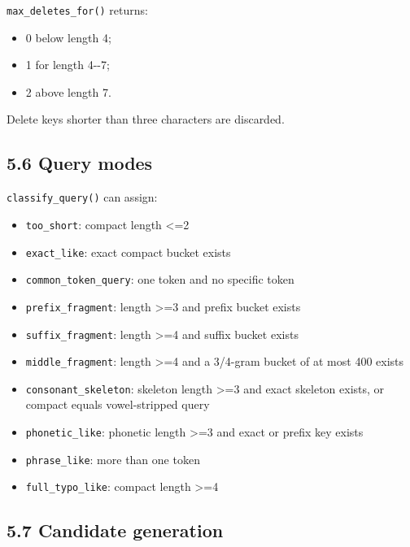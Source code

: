 \texttt{max\_\allowbreak{}deletes\_\allowbreak{}for()} returns:

\begin{itemize}
\tightlist
\item
  0 below length 4;
\item
  1 for length 4-\/-7;
\item
  2 above length 7.
\end{itemize}

Delete keys shorter than three characters are discarded.

\subsection{5.6 Query modes}\label{56-query-modes}

\texttt{classify\_\allowbreak{}query()} can assign:

\begin{itemize}
\tightlist
\item
  \texttt{too\_\allowbreak{}short}: compact length \textless=2
\item
  \texttt{exact\_\allowbreak{}like}: exact compact bucket exists
\item
  \texttt{common\_\allowbreak{}token\_\allowbreak{}query}: one token and no specific token
\item
  \texttt{prefix\_\allowbreak{}fragment}: length \textgreater=3 and prefix bucket exists
\item
  \texttt{suffix\_\allowbreak{}fragment}: length \textgreater=4 and suffix bucket exists
\item
  \texttt{middle\_\allowbreak{}fragment}: length \textgreater=4 and a 3/4-gram bucket of at most 400 exists
\item
  \texttt{consonant\_\allowbreak{}skeleton}: skeleton length \textgreater=3 and exact skeleton exists, or compact equals vowel-stripped query
\item
  \texttt{phonetic\_\allowbreak{}like}: phonetic length \textgreater=3 and exact or prefix key exists
\item
  \texttt{phrase\_\allowbreak{}like}: more than one token
\item
  \texttt{full\_\allowbreak{}typo\_\allowbreak{}like}: compact length \textgreater=4
\end{itemize}

\subsection{5.7 Candidate generation}\label{57-candidate-generation}

